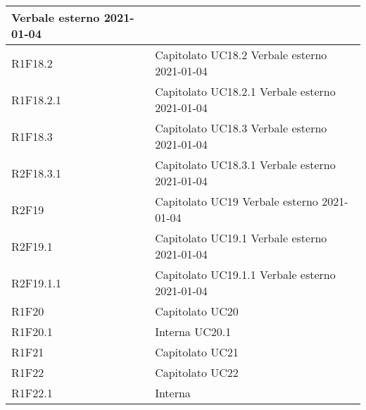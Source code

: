 \begin{center}
\begin{longtable}{|p{22mm}|p{22mm}|}
Verbale esterno 2021-01-04 \newline
\\
\hline
R1F18.2 &
Capitolato \newline
UC18.2 \newline
Verbale esterno 2021-01-04 \newline
\\
\hline
R1F18.2.1 &
Capitolato \newline
UC18.2.1 \newline
Verbale esterno 2021-01-04 \newline
\\
\hline
R1F18.3 &
Capitolato \newline
UC18.3 \newline
Verbale esterno 2021-01-04 \newline
\\
\hline
R2F18.3.1 &
Capitolato \newline
UC18.3.1 \newline
Verbale esterno 2021-01-04 \newline
\\
\hline
R2F19 &
Capitolato \newline
UC19 \newline
Verbale esterno 2021-01-04 \newline
\\
\hline
R2F19.1 &
Capitolato \newline
UC19.1 \newline
Verbale esterno 2021-01-04 \newline
\\
\hline
R2F19.1.1 &
Capitolato \newline
UC19.1.1 \newline
Verbale esterno 2021-01-04 \newline
\\
\hline
R1F20 &
Capitolato \newline
UC20 \newline
\\
\hline
R1F20.1 &
Interna \newline
UC20.1 \newline
\\
\hline
R1F21 &
Capitolato \newline
UC21 \newline
\\
\hline
R1F22 &
Capitolato \newline
UC22 \newline
\\
\hline
R1F22.1 &
Interna \newline

\end{longtable}
\end{center}
